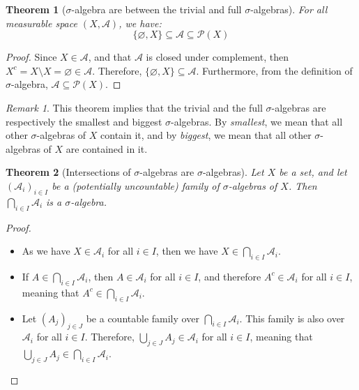 \documentclass{article}
\newtheorem{theorem}{Theorem}[section]
\theoremstyle{definition}
\theoremstyle{remark}
\newtheorem*{remark}{Remark}
\theoremstyle{example}
\theoremstyle{notation}
\begin{document}
\begin{theorem}[$\sigma$-algebra are between the trivial and full $\sigma$-algebras]
    For all measurable space $(X, \mathcal{A})$, we have:
        $$\{\varnothing, X\} \subseteq \mathcal{A} \subseteq \mathcal{P}(X)$$
\end{theorem}

\begin{proof}
    Since $X \in \mathcal{A}$, and that $\mathcal{A}$ is closed under complement, then $X^c = X \setminus X = \varnothing \in \mathcal{A}$. Therefore, $\{\varnothing, X\} \subseteq \mathcal{A}$. Furthermore, from the definition of $\sigma$-algebra, $\mathcal{A} \subseteq \mathcal{P}(X)$. 
\end{proof}

\begin{remark}
    This theorem implies that the trivial and the full $\sigma$-algebras are respectively the smallest and biggest $\sigma$-algebras. By \textit{smallest}, we mean that all other $\sigma$-algebras of $X$ contain it, and by \textit{biggest}, we mean that all other $\sigma$-algebras of $X$ are contained in it.
\end{remark}

\begin{theorem}[Intersections of $\sigma$-algebras are $\sigma$-algebras]
    Let $X$ be a set, and let $(\mathcal{A}_i)_{i \in I}$ be a (potentially uncountable) family of $\sigma$-algebras of $X$. Then $\bigcap_{i \in I} \mathcal{A}_i$ is a $\sigma$-algebra.
\end{theorem}

\begin{proof}~
    \begin{itemize}
        \item As we have $X \in \mathcal{A}_i$ for all $i \in I$, then we have $X \in \bigcap_{i \in I} \mathcal{A}_i$.
        \item If $A \in \bigcap_{i \in I} \mathcal{A}_i$, then $A \in \mathcal{A}_i$ for all $i \in I$, and therefore $A^c \in \mathcal{A}_i$ for all $i \in I$, meaning that $A^c \in \bigcap_{i \in I} \mathcal{A}_i$.
        \item Let $(A_j)_{j \in J}$ be a countable family over $\bigcap_{i \in I} \mathcal{A}_i$. This family is also over $\mathcal{A}_i$ for all $i \in I$. Therefore, $\bigcup_{j \in J} A_j \in \mathcal{A}_i$ for all $i \in I$, meaning that $\bigcup_{j \in J} A_j \in \bigcap_{i \in I} \mathcal{A}_i$.
    \end{itemize}
\end{proof}
\end{document}
